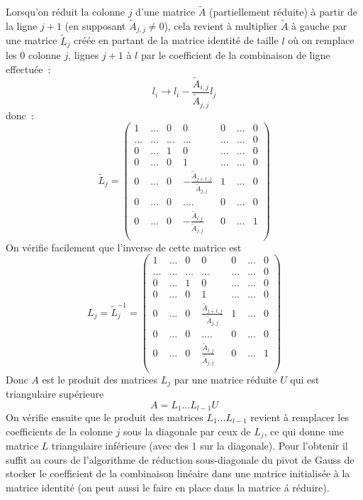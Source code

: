 \documentclass[a4paper,11pt]{article}
\begin{document}
\begin{giacjshere}
 Lorsqu'on r\'eduit la colonne $j$ d'une matrice $\tilde{A}$
 (partiellement r\'eduite) \`a partir
de la ligne $j+1$ (en supposant $\tilde{A}_{j,j} \neq 0$), cela revient \`a
multiplier $\tilde{A}$ \`a gauche par une matrice $\tilde{L}_j$ cr\'e\'ee en
partant de la matrice
identit\'e de taille $l$ o\`u on remplace les 0 
colonne $j$, lignes $j+1$ \`a $l$ par 
le coefficient de la combinaison de ligne effectu\'ee~:
$$l_i \rightarrow l_i - \frac{\tilde{A}_{i,j}}{\tilde{A}_{j,j}} l_j $$
donc~:
\[ \tilde{L}_j = \left( \begin{array}{ccccccc}
1 & ... & 0   & 0 & 0 & ... & 0\\
...& ... & ... & ... & ... & ... & 0\\
0 & ... & 1   & 0 & ... & ... & 0\\
0 & ... & 0 & 1  & ... & ... & 0 \\
0 & ... & 0 & - \frac{\tilde{A}_{j+1,j}}{\tilde{A}_{j,j}} & 1 & ... & 0 \\
 0 & ... & 0  & .... & 0 & ... & 0 \\
0 & ... & 0 & - \frac{\tilde{A}_{l,j}}{\tilde{A}_{j,j}} & 0 & ... & 1\\
\end{array} \right) \]
On v\'erifie facilement que l'inverse de cette matrice est
\[ L_j = \tilde{L}_j^{-1} = \left( \begin{array}{ccccccc}
1 & ... & 0   & 0 & 0 & ... & 0\\
...& ... & ... & ... & ... & ... & 0\\
0 & ... & 1   & 0 & ... & ... & 0\\
0 & ... & 0 & 1  & ... & ... & 0 \\
0 & ... & 0 & \frac{\tilde{A}_{j+1,j}}{\tilde{A}_{j,j}} & 1 & ... & 0 \\
 0 & ... & 0  & .... & 0 & ... & 0 \\
0 & ... & 0 & \frac{\tilde{A}_{l,j}}{\tilde{A}_{j,j}} & 0 & ... & 1\\
\end{array} \right) \]
Donc $A$ est le produit des matrices $L_j$ par une matrice r\'eduite
$U$ qui est triangulaire sup\'erieure
\[ A= L_1...L_{l-1} U \]
On v\'erifie ensuite que le produit des matrices $L_1...L_{l-1}$ revient \`a
remplacer les coefficients de la colonne $j$ sous la diagonale 
par ceux de $L_j$, ce qui donne une matrice $L$ triangulaire
inf\'erieure (avec des 1 sur la diagonale). Pour l'obtenir il suffit
au cours de l'algorithme de r\'eduction sous-diagonale du 
pivot de Gauss de stocker le coefficient
de la combinaison lin\'eaire dans une matrice initialis\'ee
\`a la matrice identit\'e (on peut aussi le faire
en place dans la matrice \'a r\'eduire).


\end{giacjshere}
\end{document}
